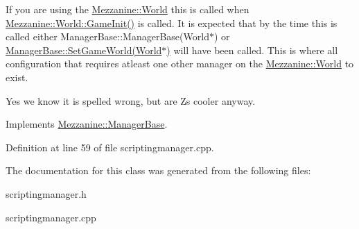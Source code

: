 If you are using the \hyperlink{classMezzanine_1_1World}{Mezzanine::World} this is called when \hyperlink{classMezzanine_1_1World_a72d6d82926bfbfca96c246f109f0fc58}{Mezzanine::World::GameInit()} is called. It is expected that by the time this is called either ManagerBase::ManagerBase(World$\ast$) or \hyperlink{classMezzanine_1_1ManagerBase_acb66b1edbb0f256fb1d4d4d2126f073e}{ManagerBase::SetGameWorld(World$\ast$)} will have been called. This is where all configuration that requires atleast one other manager on the \hyperlink{classMezzanine_1_1World}{Mezzanine::World} to exist.\par
\par
 Yes we know it is spelled wrong, but are Zs cooler anyway.  

Implements \hyperlink{classMezzanine_1_1ManagerBase_a864e3cac11928a602c1db28fa2d52ee2}{Mezzanine::ManagerBase}.



Definition at line 59 of file scriptingmanager.cpp.



The documentation for this class was generated from the following files:\begin{DoxyCompactItemize}
\item 
scriptingmanager.h\item 
scriptingmanager.cpp\end{DoxyCompactItemize}
